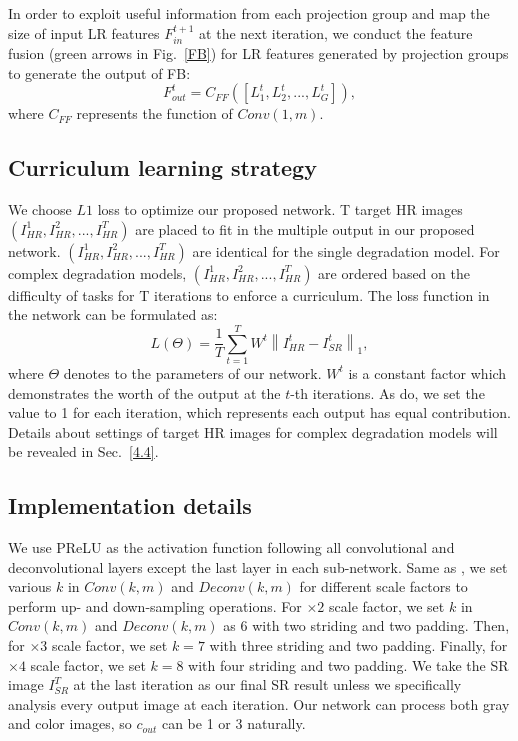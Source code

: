 \documentclass[10pt,twocolumn,letterpaper]{article}
\begin{document}
	In order to exploit useful information from each projection group and map the size of input LR features $F_{in}^{t+1}$ at the next iteration, we conduct the feature fusion (green arrows in Fig.~\ref{FB}) for LR features generated by projection groups to generate the output of FB:
	\begin{equation}
	F_{out}^{t} = C_{FF}([L_{1}^{t}, L_{2}^{t},...,L_{G}^{t}]),
	\end{equation}
	where $C_{FF}$ represents the function of $Conv(1,m)$.
	
	\subsection{Curriculum learning strategy}
	\label{3.3}
	We choose $L1$ loss to optimize our proposed network. T target HR images $(I_{HR}^{1}, I_{HR}^{2}, ..., I_{HR}^{T})$ are placed to fit in the multiple output in our proposed network. $(I_{HR}^{1}, I_{HR}^{2}, ..., I_{HR}^{T})$ are identical for the single degradation model. For complex degradation models, $(I_{HR}^{1}, I_{HR}^{2}, ..., I_{HR}^{T})$ are ordered based on the difficulty of tasks for T iterations to enforce a curriculum. The loss function in the network can be formulated as:
	\begin{equation}
	L(\Theta) = \frac{1}{T}\sum_{t=1}^{T}{W^t}\left \|I_{HR}^{t} - I_{SR}^{t}\right \|_{1},
	\end{equation}
	where $\Theta$ denotes to the parameters of our network. $W^{t}$ is a constant factor which demonstrates the worth of the output at the $t$-th iterations. As \cite{Zamir_2017_CVPR} do, we set the value to 1 for each iteration, which represents each output has equal contribution. Details about settings of target HR images for complex degradation models will be revealed in Sec.~\ref{4.4}.
	
	\subsection{Implementation details}
	We use PReLU\cite{DBLP:conf/iccv/HeZRS15} as the activation function following all convolutional and deconvolutional layers except the last layer in each sub-network. Same as \cite{Haris_2018_CVPR}, we set various $k$ in $Conv(k,m)$ and $Deconv(k,m)$ for different scale factors to perform up- and down-sampling operations. For $\times2$ scale factor, we set $k$ in $Conv(k,m)$ and $Deconv(k,m)$ as 6 with two striding and two padding. Then, for $\times3$ scale factor, we set $k=7$  with three striding and two padding. Finally, for $\times4$ scale factor, we set $k=8$ with four striding and two padding. We take the SR image $I_{SR}^T$ at the last iteration as our final SR result unless we specifically analysis every output image at each iteration. Our network can process both gray and color images, so $c_{out}$ can be 1 or 3 naturally.
	
\end{document}
